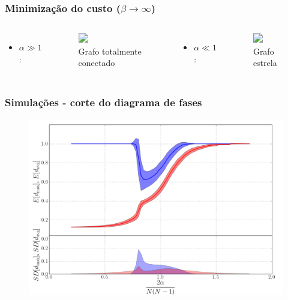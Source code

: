 \documentclass[ignorenonframetext,]{beamer}
\makeatletter
\def\ScaleIfNeededV{%
  \ifdim\Gin@nat@width>0.9\linewidth
    0.9\linewidth
  \else
    \Gin@nat@width
  \fi
}
\def\ScaleIfNeededH{%
  \ifdim\Gin@nat@height>0.9\textheight
    0.9\textheight
  \else
    \Gin@nat@height
  \fi
}
\let\Oldincludegraphics\includegraphics
\renewcommand{\includegraphics}[2][]{\Oldincludegraphics[width=\ScaleIfNeededV,height=\ScaleIfNeededH,keepaspectratio]{#2}}
\makeatother
\begin{document}
\begin{frame}\frametitle{Minimização do custo ($\beta \to \infty$)}
    \begin{columns}
	  \begin{itemize}
	  \itemsep1pt\parskip0pt
	  \item
	    $\alpha \gg 1$:
	  \end{itemize}

	  \begin{figure}[htbp]
	  \centering
	  \Oldincludegraphics[height=0.7\textheight]{./figs/fullyconnected.png}
	  \caption{Grafo totalmente conectado}
	  \end{figure}
	  \begin{itemize}
	  \itemsep1pt\parskip0pt
	  \item
	    $\alpha \ll 1$:
	  \end{itemize}

	  \begin{figure}[htbp]
	  \centering
	  \Oldincludegraphics[height=0.7\textheight]{./figs/starGraph.png}
	  \caption{Grafo estrela}
	  \end{figure}
      \end{columns}
\end{frame}


\begin{frame}\frametitle{Simulações - corte do diagrama de fases}

\begin{figure}[htbp]
\centering
\includegraphics{./figs/cut.png}
\end{figure}

\end{frame}
\end{document}
